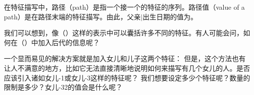 在特征描写中，路径（path）是指一个接一个的特征的序列。路径值（value of a path）是在路径末端的特征描写。由此，\textsc{父亲$|$出生日期}的值为。

我们可以想到，像（）这样的表示中可以囊括许多不同的特征。有人可能会问，如何在（）中加入后代的信息呢？

一个显而易见的解决方案就是加入\textsc{女儿}和\textsc{儿子}这两个特征：
\ea
{}
\z
但是，这个方法也有让人不满意的地方，比如它无法直接清晰地说明如何来描写有几个女儿的人。是否应该引入诸如\textsc{女儿-1}或\textsc{女儿-3}这样的特征呢？
\ea
{}
\z
我们想要设定多少个特征呢？数量的限制是多少？\textsc{女儿-32}的值会是什么呢？

